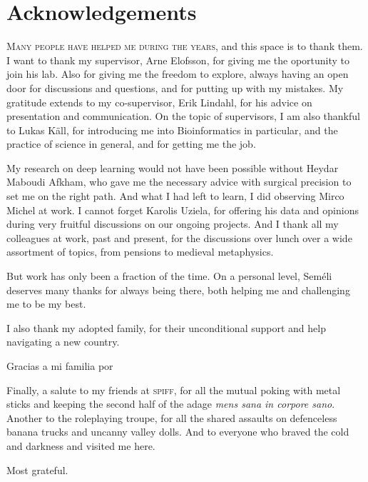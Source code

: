 \chapter*{Acknowledgements}

\lettrine[lines=3, lhang=0.15, nindent=0em]{\color{Maroon}M}{any people have helped me during the years,}
and this space is to thank them.
I want to thank my supervisor, Arne Elofsson, for giving me the oportunity to join his lab.
Also for giving me the freedom to explore, always having an open door for discussions and questions, and for putting up with my mistakes.
My gratitude extends to my co-supervisor, Erik Lindahl, for his advice on presentation and communication.
On the topic of supervisors, I am also thankful to Lukas Käll, for introducing me into Bioinformatics in particular, and the practice of science in general, and for getting me the job.

\begin{center}
    {\color{Maroon}\adfleafleft}
\end{center}

My research on deep learning would not have been possible without Heydar Maboudi Afkham, who gave me the necessary advice with surgical precision to set me on the right path.
And what I had left to learn, I did observing Mirco Michel at work.
I cannot forget Karolis Uziela, for offering his data and opinions during very fruitful discussions on our ongoing projects.
And I thank all my colleagues at work, past and present, for the discussions over lunch over a wide assortment of topics, from pensions to medieval metaphysics. 

\begin{center}
    {\color{Maroon}\adfflowerleft}
\end{center}

But work has only been a fraction of the time.
On a personal level, Seméli deserves many thanks for always being there, both helping me and challenging me to be my best.

I also thank my adopted family, for their unconditional support and help navigating a new country.

\begin{otherlanguage}{spanish}
	Gracias a mi familia por 
\end{otherlanguage}

\begin{center}
    \medskip
    {\color{Maroon}\adfdownleafright}
    \medskip
\end{center}

Finally, a salute to my friends at \textsc{spiff}, for all the mutual poking with metal sticks and keeping the second half of the adage \emph{mens sana in corpore sano}.
Another to the roleplaying troupe, for all the shared assaults on defenceless banana trucks and uncanny valley dolls.
And to everyone who braved the cold and darkness and visited me here.

\bigskip
\hfil
\raggedleft
Most grateful.



